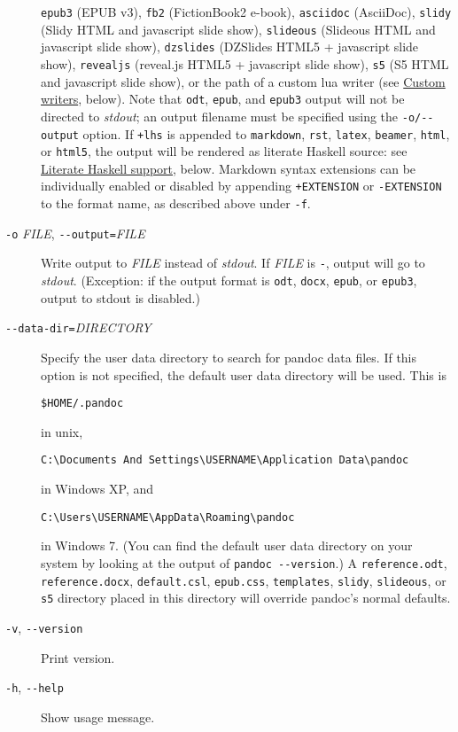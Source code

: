 \documentclass[]{article}
\begin{document}
\begin{description}
\texttt{epub3} (EPUB v3), \texttt{fb2} (FictionBook2 e-book),
\texttt{asciidoc} (AsciiDoc), \texttt{slidy} (Slidy HTML and javascript
slide show), \texttt{slideous} (Slideous HTML and javascript slide
show), \texttt{dzslides} (DZSlides HTML5 + javascript slide show),
\texttt{revealjs} (reveal.js HTML5 + javascript slide show), \texttt{s5}
(S5 HTML and javascript slide show), or the path of a custom lua writer
(see \hyperref[custom-writers]{Custom writers}, below). Note that
\texttt{odt}, \texttt{epub}, and \texttt{epub3} output will not be
directed to \emph{stdout}; an output filename must be specified using
the \texttt{-o/-{}-output} option. If \texttt{+lhs} is appended to
\texttt{markdown}, \texttt{rst}, \texttt{latex}, \texttt{beamer},
\texttt{html}, or \texttt{html5}, the output will be rendered as
literate Haskell source: see
\hyperref[literate-haskell-support]{Literate Haskell support}, below.
Markdown syntax extensions can be individually enabled or disabled by
appending \texttt{+EXTENSION} or \texttt{-EXTENSION} to the format name,
as described above under \texttt{-f}.
\item[\texttt{-o} \emph{FILE}, \texttt{-{}-output=}\emph{FILE}]
Write output to \emph{FILE} instead of \emph{stdout}. If \emph{FILE} is
\texttt{-}, output will go to \emph{stdout}. (Exception: if the output
format is \texttt{odt}, \texttt{docx}, \texttt{epub}, or \texttt{epub3},
output to stdout is disabled.)
\item[\texttt{-{}-data-dir=}\emph{DIRECTORY}]
Specify the user data directory to search for pandoc data files. If this
option is not specified, the default user data directory will be used.
This is

\begin{verbatim}
$HOME/.pandoc
\end{verbatim}

in unix,

\begin{verbatim}
C:\Documents And Settings\USERNAME\Application Data\pandoc
\end{verbatim}

in Windows XP, and

\begin{verbatim}
C:\Users\USERNAME\AppData\Roaming\pandoc
\end{verbatim}

in Windows 7. (You can find the default user data directory on your
system by looking at the output of \texttt{pandoc -{}-version}.) A
\texttt{reference.odt}, \texttt{reference.docx}, \texttt{default.csl},
\texttt{epub.css}, \texttt{templates}, \texttt{slidy},
\texttt{slideous}, or \texttt{s5} directory placed in this directory
will override pandoc's normal defaults.
\item[\texttt{-v}, \texttt{-{}-version}]
Print version.
\item[\texttt{-h}, \texttt{-{}-help}]
Show usage message.
\end{description}
\end{document}

